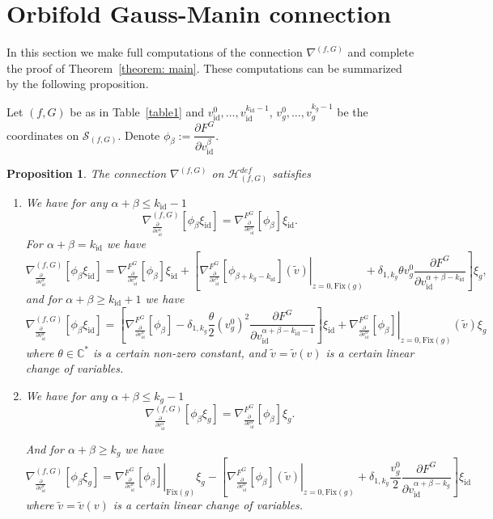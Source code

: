 \documentclass[reqno,12pt]{amsart}
\numberwithin{equation}{section}
\theoremstyle{plain}
\newtheorem{proposition}[theorem]{Proposition}
\def\p{\partial }
\theoremstyle{definition}
\newcommand{\CC}{{\mathbb{C}}}
\newcommand{\Fix}{\mathrm{Fix}}
\newcommand{\id}{\mathrm{id}}
\def\H{{\mathcal H}}
\numberwithin{equation}{section}
\begin{document}
\section{Orbifold Gauss-Manin connection}\label{section: proof-2}
In this section we make full computations of the connection $\nabla^{(f,G)}$ and complete the proof of Theorem~\ref{theorem: main}. These computations can be summarized by the following proposition.

Let $(f,G)$ be as in Table~\ref{table1} and $v_\id^0,\dots,v_\id^{k_\id-1}$, $v_g^0,\dots,v_g^{k_g-1}$ be the coordinates on $\mathcal{S}_{(f,G)}$. Denote $\phi_{\beta} := \dfrac{\p F^G}{\p v_\id^{\beta}}$.

\begin{proposition}
The connection $\nabla^{(f,G)}$ on $\H_{(f,G)}^{def}$ satisfies
\begin{enumerate}
    
\item We have for any $\alpha+\beta \le k_{\id}-1$
\[
\nabla_{\frac{\partial}{\partial v^\alpha_{\id}}}^{(f,G)}[\phi_{\beta} \xi_\id] 
=  \nabla^{F^G}_{\frac{\partial}{\partial v^\alpha_\id}}[\phi_{\beta}]\xi_{\id}.
\]
For $\alpha+\beta = k_{\id}$ we have
\[\nabla_{\frac{\partial}{\partial v^\alpha_{\id}}}^{(f,G)}[\phi_{\beta} \xi_{\id}] 
    = \nabla^{F^G}_{\frac{\partial}{\partial v^\alpha_{\id}}}[\phi_\beta ]\xi_{\id} + \left[\left.\nabla^{F^G}_{\frac{\partial}{\partial v^\alpha_{\id}}}[\phi_{\beta + k_{g} - k_{\id}}](\widetilde v) \right\vert_{z=0, \Fix(g)} + \delta_{1,k_{g}} \theta v_g^{0}
\frac{\p F^G}{\p v_\id^{\alpha+\beta-k_{\id}}}\right]\xi_{g}, \]
and for $\alpha+\beta \ge k_{\id} +1$ we have
\[\nabla_{\frac{\partial}{\partial v^\alpha_{\id}}}^{(f,G)}[\phi_{\beta} \xi_{\id}] 
=  \left[ \nabla^{F^G}_{\frac{\partial}{\partial v^\alpha_{\id}}}[\phi_{\beta} ] - \delta_{1,k_{g}} \frac{\theta}{2}(v_g^{0})^2  
\frac{\p F^G}{\p v_\id^{\alpha+\beta-k_{\id}-1}} \right]   \xi_{\id} + \left.\nabla^{F^G}_{\frac{\partial}{\partial v^\alpha_{\id}}}[\phi_{\beta}] \right\vert_{z=0, \Fix(g)} (\widetilde v) \xi_{g} \] 
where  $\theta  \in \CC^*$ is a certain non-zero constant, and $\widetilde v = \widetilde v(v)$ is a certain linear change of variables.
\item
We have for any $\alpha+\beta \le k_{g}-1$
\[
\nabla_{\frac{\partial}{\partial v^\alpha_{\id}}}^{(f,G)}[\phi_{\beta}  \xi_{g}]   = \nabla^{F^G}_{\frac{\partial}{\partial v^\alpha_{\id}}}[\phi_\beta]\xi_{g}.
\]

And for $\alpha+\beta \ge k_{g} $ we have
\[\nabla_{\frac{\partial}{\partial v^\alpha_{\id}}}^{(f,G)}[\phi_{\beta} \xi_{g}] 
=  \left. \nabla^{F^G}_{\frac{\partial}{\partial v^\alpha_{\id}}}[\phi_{\beta}]\right\vert_{\Fix(g)}\xi_{g} -\left[  \left.\nabla^{F^G}_{\frac{\partial}{\partial v^\alpha_\id}}[\phi_{\beta}] (\widetilde v) \right\vert_{z=0, \Fix(g)}+ \delta_{1,k_{g}} \frac{v_g^{0} }{2} 
\frac{\p F^G}{\p v_\id^{\alpha+\beta-k_{g}}} \right]\xi_{\id}  \] 
where  $\widetilde v = \widetilde v(v)$ is a certain linear change of variables.


\end{enumerate}
\end{proposition}
\end{document}

